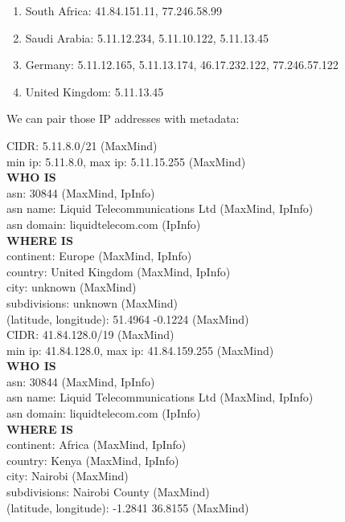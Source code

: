 \documentclass[twocolumn]{article}
\begin{document}
\begin{enumerate}
    \item South Africa: 41.84.151.11, 77.246.58.99
    \item Saudi Arabia: 5.11.12.234, 5.11.10.122, 5.11.13.45
    \item Germany: 5.11.12.165, 5.11.13.174, 46.17.232.122, 77.246.57.122
    \item United Kingdom: 5.11.13.45
\end{enumerate}
We can pair those IP addresses with metadata:

CIDR: 5.11.8.0/21 (MaxMind)\\
min ip: 5.11.8.0, max ip: 5.11.15.255 (MaxMind)\\
\textbf{WHO IS}\\
asn: 30844 (MaxMind, IpInfo)\\
asn name: Liquid Telecommunications Ltd (MaxMind, IpInfo)\\
asn domain: liquidtelecom.com (IpInfo)\\
\textbf{WHERE IS}\\
continent: Europe (MaxMind, IpInfo)\\
country: United Kingdom (MaxMind, IpInfo)\\
city: unknown (MaxMind)\\
subdivisions: unknown (MaxMind)\\
(latitude, longitude): 51.4964 -0.1224 (MaxMind)\\

CIDR: 41.84.128.0/19 (MaxMind)\\
min ip: 41.84.128.0, max ip: 41.84.159.255 (MaxMind)\\
\textbf{WHO IS}\\
asn: 30844 (MaxMind, IpInfo)\\
asn name: Liquid Telecommunications Ltd (MaxMind, IpInfo)\\
asn domain: liquidtelecom.com (IpInfo)\\
\textbf{WHERE IS}\\
continent: Africa (MaxMind, IpInfo)\\
country: Kenya (MaxMind, IpInfo)\\
city: Nairobi (MaxMind)\\
subdivisions: Nairobi County (MaxMind)\\
(latitude, longitude): -1.2841 36.8155 (MaxMind)\\
\end{document}
